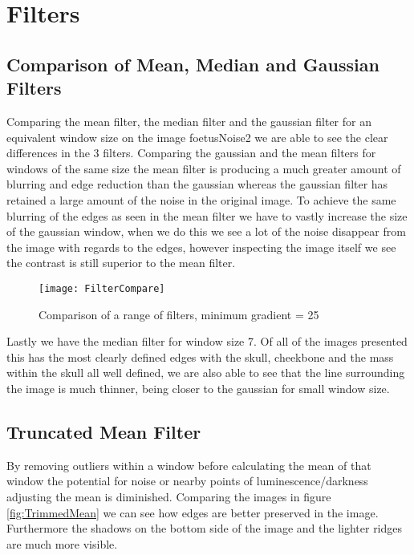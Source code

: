 \documentclass{article}
\begin{document}
\section{Filters}



\subsection{Comparison of Mean, Median and Gaussian Filters}
Comparing the mean filter, the median filter and the gaussian filter for an equivalent window size on the image foetusNoise2 we are able to see the clear differences in the 3 filters. Comparing the gaussian and the mean filters for windows of the same size the mean filter is producing a much greater amount of blurring and edge reduction than the gaussian whereas the gaussian filter has retained a large amount of the noise in the original image. To achieve the same blurring of the edges as seen in the mean filter we have to vastly increase the size of the gaussian window, when we do this we see a lot of the noise disappear from the image with regards to the edges, however inspecting the image itself we see the contrast is still superior to the mean filter. 

\begin{figure}[h!]
	\centering
	\texttt{[image: FilterCompare]}
	\caption{Comparison of a range of filters, minimum gradient = 25}
	\label{fig:FilterCompare}
\end{figure}

Lastly we have the median filter for window size 7. Of all of the images presented this has the most clearly defined edges with the skull, cheekbone and the mass within the skull all well defined, we are also able to see that the line surrounding the image is much thinner, being closer to the gaussian for small window size. 



\subsection{Truncated Mean Filter}

By removing outliers within a window before calculating the mean of that window the potential for noise or nearby points of luminescence/darkness adjusting the mean is diminished. Comparing the images in figure \ref{fig:TrimmedMean} we can see how edges are better preserved in the image. Furthermore the shadows on the bottom side of the image and the lighter ridges are much more visible.
\end{document}
